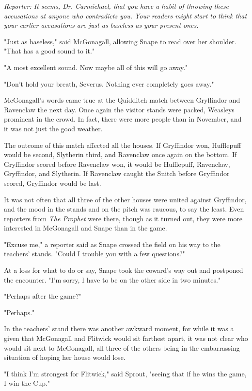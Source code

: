 \documentclass[a4paper,11pt]{article}
\begin{document}
\emph{Reporter: It seems, Dr. Carmichael, that you have a habit of throwing these accusations at anyone who contradicts you. Your readers might start to think that your earlier accusations are just as baseless as your present ones.}

"Just as baseless," said McGonagall, allowing Snape to read over her shoulder. "That has a good sound to it."

"A most excellent sound. Now maybe all of this will go away."

"Don't hold your breath, Severus. Nothing ever completely goes away."

McGonagall's words came true at the Quidditch match between Gryffindor and Ravenclaw the next day. Once again the visitor stands were packed, Weasleys prominent in the crowd. In fact, there were more people than in November, and it was not just the good weather.

The outcome of this match affected all the houses. If Gryffindor won, Hufflepuff would be second, Slytherin third, and Ravenclaw once again on the bottom. If Gryffindor scored before Ravenclaw won, it would be Hufflepuff, Ravenclaw, Gryffindor, and Slytherin. If Ravenclaw caught the Snitch before Gryffindor scored, Gryffindor would be last.

It was not often that all three of the other houses were united against Gryffindor, and the mood in the stands and on the pitch was raucous, to say the least. Even reporters from \emph{The Prophet} were there, though as it turned out, they were more interested in McGonagall and Snape than in the game.

"Excuse me," a reporter said as Snape crossed the field on his way to the teachers' stands. "Could I trouble you with a few questions?"

At a loss for what to do or say, Snape took the coward's way out and postponed the encounter. "I'm sorry, I have to be on the other side in two minutes."

"Perhaps after the game?"

"Perhaps."

In the teachers' stand there was another awkward moment, for while it was a given that McGonagall and Flitwick would sit farthest apart, it was not clear who would sit next to McGonagall, all three of the others being in the embarrassing situation of hoping her house would lose.

"I think I'm strongest for Flitwick," said Sprout, "seeing that if he wins the game, I win the Cup."
\end{document}
